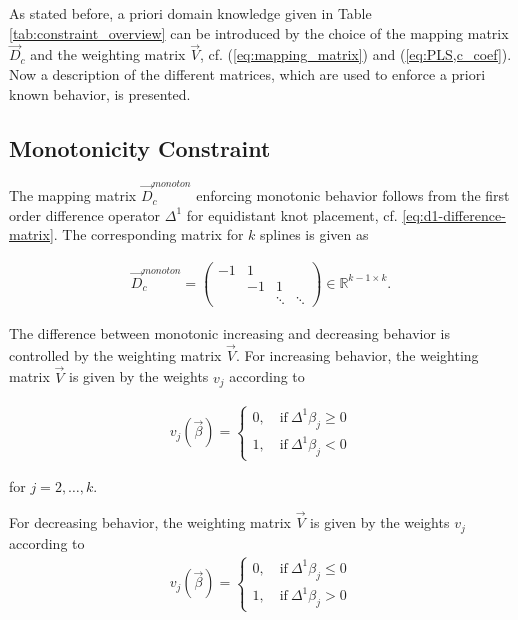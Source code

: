 \documentclass[10pt,a4paper]{report}
\begin{document}
As stated before, a priori domain knowledge given in Table \ref{tab:constraint_overview} can be introduced by the choice of the mapping matrix $\vec{D}_c$ and the weighting matrix $\vec{V}$, cf. (\ref{eq:mapping_matrix}) and (\ref{eq:PLS,c_coef}). Now a description of the different matrices, which are used to enforce a priori known behavior, is presented. 

\subsection{Monotonicity Constraint}

The mapping matrix $\vec{D}_c^{monoton}$ enforcing monotonic behavior follows from the first order difference operator $\Delta^1$ for equidistant knot placement, cf. \ref{eq:d1-difference-matrix}. The corresponding matrix for $k$ splines is given as

\begin{align} \label{eq:D_c_monoton}
	\vec{D}_c^{monoton} = \begin{pmatrix}  -1 & 1  &  		& \\ 
		& -1 & 1 		& \\ 
		&    & \ddots  & \ddots  
	\end{pmatrix} \in \mathbb{R}^{k-1 \times k}.
\end{align}

The difference between monotonic increasing and decreasing behavior is controlled by the weighting matrix $\vec{V}$. For increasing behavior, the weighting matrix $\vec{V}$ is given by the weights $v_j$ according to

\begin{align} \label{eq:v_monoton_inc}
	v_j(\vec{\beta}) = \begin{cases}
			0, \quad \text{if} \ \Delta^1\beta_j \ge 0 \\ 
			1, \quad \text{if} \ \Delta^1\beta_j < 0
	\end{cases}	
\end{align}

for $j=2, \dots, k$. 

For decreasing behavior, the weighting matrix $\vec{V}$ is given by the weights $v_j$ according to
\begin{align} \label{eq:v_monoton_dec}
	v_j(\vec{\beta}) = \begin{cases} 0, \quad \text{if} \ \Delta^1\beta_j \le 0 \\ 
		1, \quad \text{if} \ \Delta^1\beta_j > 0
	\end{cases}	
\end{align}
\end{document}
